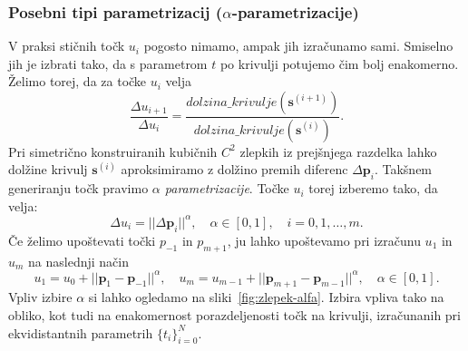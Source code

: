 \documentclass[isrm2, tisk]{fmfdelo}
\newcommand{\p}{\mathbf{p}}
\begin{document}
    \subsubsection{Posebni tipi parametrizacij ($\alpha$-parametrizacije)}
    V praksi stičnih točk $u_i$ pogosto nimamo, ampak jih izračunamo sami.
    Smiselno jih je izbrati tako, da s parametrom $t$ po krivulji potujemo čim bolj enakomerno.
    Želimo torej, da za točke $u_i$ velja \[\frac{\Delta u_{i+1}}{\Delta u_i} = \frac{dolzina\_krivulje(\mathbf{s}^{(i+1)})}{dolzina\_krivulje(\mathbf{s}^{(i)})}.\]
    Pri simetrično konstruiranih kubičnih $C^2$ zlepkih iz prejšnjega razdelka lahko dolžine krivulj $\mathbf{s}^{(i)}$ aproksimiramo z dolžino premih diferenc $\Delta \p_i$.
    Takšnem generiranju točk pravimo \textit{$\alpha$ parametrizacije}.
    Točke $u_i$ torej izberemo tako, da velja:
    \[\Delta u_i=||\Delta \p_i||^{\alpha},\quad \alpha\in[0,1],\quad i=0,1,\ldots,m.\]
    Če želimo upoštevati točki $p_{-1}$ in $p_{m+1}$, ju lahko upoštevamo pri izračunu $u_1$ in $u_m$ na naslednji način
    \[ u_1=u_0+|| \p_1-\p_{-1}||^{\alpha}, \quad  u_m=u_{m-1}+|| \p_{m+1}-\p_{m-1}||^{\alpha}, \quad  \alpha\in[0,1].\]
    Vpliv izbire $\alpha$ si lahko ogledamo na sliki~\ref{fig:zlepek-alfa}.
    Izbira vpliva tako na obliko, kot tudi na enakomernost porazdeljenosti točk na krivulji, izračunanih pri ekvidistantnih parametrih $\{t_i\}_{i=0}^{N}$.
\end{document}

